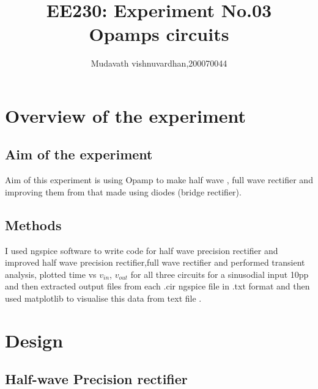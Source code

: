 \documentclass[12pt]{article}
\title{EE230: Experiment No.03\\
Opamps circuits\\}
\author{Mudavath vishnuvardhan,200070044}
\begin{document}
\maketitle

\section{Overview of the experiment} %

\subsection{Aim of the experiment}%
Aim of this experiment is using Opamp to make half wave , full wave rectifier and improving them from that made using diodes (bridge rectifier).

\subsection{ Methods}

I used ngspice software to write code for half wave precision rectifier and improved half wave precision rectifier,full wave rectifier and performed transient analysis, plotted time vs \(v_{in}\), \(v_{out}\) for all three circuits for a sinusodial input 10pp  and then extracted output files from each .cir ngspice file in .txt format and then used matplotlib to visualise this data from text file .
\newpage

\section{Design}%

\subsection{Half-wave Precision rectifier}
\end{document}
